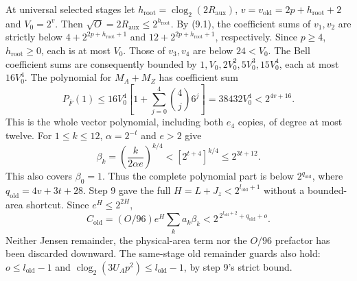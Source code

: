 At universal selected stages let
$h_{\mathrm{root}}=\operatorname{clog}_2(2R_{\mathrm{aux}})$,
$v=v_{\mathrm{old}}=2p+h_{\mathrm{root}}+2$ and $V_0=2^v$.
Then $\sqrt O=2R_{\mathrm{aux}}\le2^{h_{\mathrm{root}}}$.
By (9.1), the coefficient sums of $v_1,v_2$ are strictly below
$4+2^{2p+h_{\mathrm{root}}+1}$ and $12+2^{2p+h_{\mathrm{root}}+1}$,
respectively. Since $p\ge4$, $h_{\mathrm{root}}\ge0$, each is at most
$V_0$. Those of $v_3,v_4$ are below $24<V_0$.
The Bell coefficient sums are consequently bounded by
$1,V_0,2V_0^2,5V_0^3,15V_0^4$, each at most $16V_0^4$.
The polynomial for $M_A+M_Z$ has coefficient sum
\begin{equation}
 P_{\overline F}(1)\le16V_0^4
 \left[1+\sum_{j=0}^4\binom4j6^j\right]
 =38432V_0^4<2^{4v+16}.\tag{11.4}
\end{equation}
This is the whole vector polynomial, including both $e_4$ copies, of
degree at most twelve. For $1\le k\le12$, $\alpha=2^{-t}$ and $e>2$ give
\[
 \beta_k=\left(\frac{k}{2\alpha e}\right)^{k/4}
 <[2^{t+4}]^{k/4}\le2^{3t+12}.
\]
This also covers $\beta_0=1$. Thus the complete polynomial part is below
$2^{q_{\mathrm{old}}}$, where $q_{\mathrm{old}}=4v+3t+28$.
Step 9 gave the full $H=L+J_z<2^{l_{\mathrm{old}}+1}$ without a bounded-area
shortcut. Since $e^H\le2^{2H}$,
\begin{equation}
 C_{\mathrm{old}}=(O/96)e^H\sum_k a_k\beta_k
 <2^{\,2^{l_{\mathrm{old}}+2}+q_{\mathrm{old}}+o}.\tag{11.5}
\end{equation}
Neither Jensen remainder, the physical-area term nor the $O/96$ prefactor
has been discarded downward. The same-stage old remainder guards also
hold: $o\le l_{\mathrm{old}}-1$ and
$\operatorname{clog}_2(3U_Ap^2)\le l_{\mathrm{old}}-1$, by step 9's strict bound.

